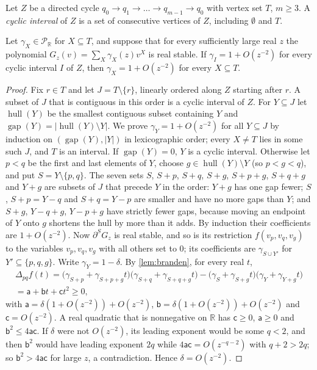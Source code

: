 \documentclass[final]{siamart0516}
\numberwithin{theorem}{section}
\numberwithin{equation}{section}
\theoremstyle{siamnonum}
\theoremstyle{plain}
\newcommand{\RR}{\mathbb{R}}
\newcommand{\Puis}{\mathcal{P}_{\RR}}
\begin{document}
Let $Z$ be a directed cycle $q_0\to q_1\to\dots\to q_{m-1}\to q_0$ with vertex set $T$, $m\ge3$. A \emph{cyclic interval} of $Z$ is a set of consecutive vertices of $Z$, including $\emptyset$ and $T$.

\begin{lemma}[tameness]\label{lem:tameness}
Let $\gamma_X\in\Puis$ for $X\subseteq T$, and suppose that for every sufficiently large real $z$ the polynomial $G_z(v)=\sum_{X}\gamma_X(z)v^X$ is real stable. If $\gamma_I=1+O(z^{-2})$ for every cyclic interval $I$ of $Z$, then $\gamma_X=1+O(z^{-2})$ for every $X\subseteq T$.
\end{lemma}

\begin{proof}
Fix $r\in T$ and let $J=T\setminus\{r\}$, linearly ordered along $Z$ starting after $r$. A subset of $J$ that is contiguous in this order is a cyclic interval of $Z$. For $Y\subseteq J$ let $\operatorname{hull}(Y)$ be the smallest contiguous subset containing $Y$ and $\operatorname{gap}(Y)=|\operatorname{hull}(Y)\setminus Y|$. We prove $\gamma_Y=1+O(z^{-2})$ for all $Y\subseteq J$ by induction on $(\operatorname{gap}(Y),|Y|)$ in lexicographic order; every $X\ne T$ lies in some such $J$, and $T$ is an interval.
If $\operatorname{gap}(Y)=0$, $Y$ is a cyclic interval. Otherwise let $p<q$ be the first and last elements of $Y$, choose $g\in\operatorname{hull}(Y)\setminus Y$ (so $p<g<q$), and put $S=Y\setminus\{p,q\}$. The seven sets $S$, $S+p$, $S+q$, $S+g$, $S+p+g$, $S+q+g$ and $Y+g$ are subsets of $J$ that precede $Y$ in the order: $Y+g$ has one gap fewer; $S$, $S+p=Y-q$ and $S+q=Y-p$ are smaller and have no more gaps than $Y$; and $S+g$, $Y-q+g$, $Y-p+g$ have strictly fewer gaps, because moving an endpoint of $Y$ onto $g$ shortens the hull by more than it adds. By induction their coefficients are $1+O(z^{-2})$.
Now $\partial^S G_z$ is real stable, and so is its restriction $f(v_p,v_q,v_g)$ to the variables $v_p,v_q,v_g$ with all others set to $0$; its coefficients are $\gamma_{S\cup Y'}$ for $Y'\subseteq\{p,q,g\}$. Write $\gamma_Y=1-\delta$. By \cref{lem:branden}, for every real $t$,
\begin{multline*}
\Delta_{pq}f(t)=\bigl(\gamma_{S+p}+\gamma_{S+p+g}t\bigr)\bigl(\gamma_{S+q}+\gamma_{S+q+g}t\bigr)-\bigl(\gamma_S+\gamma_{S+g}t\bigr)\bigl(\gamma_Y+\gamma_{Y+g}t\bigr)\\
=\mathsf a+\mathsf bt+\mathsf ct^2\ge0,
\end{multline*}
with $\mathsf a=\delta(1+O(z^{-2}))+O(z^{-2})$, $\mathsf b=\delta(1+O(z^{-2}))+O(z^{-2})$ and $\mathsf c=O(z^{-2})$. A real quadratic that is nonnegative on $\RR$ has $\mathsf c\ge0$, $\mathsf a\ge0$ and $\mathsf b^2\le4\mathsf a\mathsf c$. If $\delta$ were not $O(z^{-2})$, its leading exponent would be some $q<2$, and then $\mathsf b^2$ would have leading exponent $2q$ while $4\mathsf a\mathsf c=O(z^{-q-2})$ with $q+2>2q$; so $\mathsf b^2>4\mathsf a\mathsf c$ for large $z$, a contradiction. Hence $\delta=O(z^{-2})$.
\end{proof}
\end{document}
